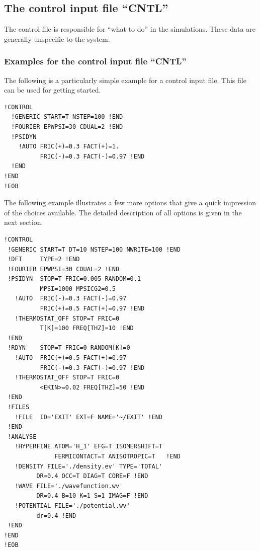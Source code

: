 \documentclass[final,12pt,makeidx,DIV=calc]{article}
\begin{document}
%
\subsection{The control input file ``CNTL''}

The control file is responsible for ``what to do'' in the
simulations. These data are generally unspecific to the system.

\subsubsection{Examples for the control input file ``CNTL''}
The following is a particularly simple example for a control input
file. This file can be used for getting started.

\begin{verbatim}
!CONTROL
  !GENERIC START=T NSTEP=100 !END   
  !FOURIER EPWPSI=30 CDUAL=2 !END
  !PSIDYN  
    !AUTO FRIC(+)=0.3 FACT(+)=1. 
          FRIC(-)=0.3 FACT(-)=0.97 !END
  !END
!END         
!EOB
\end{verbatim}

The following example illustrates a few more options that give a quick
impression of the choices available. The detailed description of all
options is given in the next section.

\begin{verbatim}
!CONTROL
 !GENERIC START=T DT=10 NSTEP=100 NWRITE=100 !END   
 !DFT     TYPE=2 !END
 !FOURIER EPWPSI=30 CDUAL=2 !END
 !PSIDYN  STOP=T FRIC=0.005 RANDOM=0.1 
          MPSI=1000 MPSICG2=0.5 
   !AUTO  FRIC(-)=0.3 FACT(-)=0.97 
          FRIC(+)=0.5 FACT(+)=0.97 !END
   !THERMOSTAT_OFF STOP=T FRIC=0 
          T[K]=100 FREQ[THZ]=10 !END 
 !END
 !RDYN    STOP=T FRIC=0 RANDOM[K]=0 
   !AUTO  FRIC(+)=0.5 FACT(+)=0.97 
          FRIC(-)=0.3 FACT(-)=0.97 !END
   !THERMOSTAT_OFF STOP=T FRIC=0 
          <EKIN>=0.02 FREQ[THZ]=50 !END
 !END
 !FILES
   !FILE  ID='EXIT' EXT=F NAME='~/EXIT' !END
 !END
 !ANALYSE 
   !HYPERFINE ATOM='H_1' EFG=T ISOMERSHIFT=T 
              FERMICONTACT=T ANISOTROPIC=T   !END
   !DENSITY FILE='./density.ev' TYPE='TOTAL' 
         DR=0.4 OCC=T DIAG=T CORE=F !END
   !WAVE FILE='./wavefunction.wv' 
         DR=0.4 B=10 K=1 S=1 IMAG=F !END
   !POTENTIAL FILE='./potential.wv'
         dr=0.4 !END
 !END
!END
!EOB
\end{verbatim}
\end{document}

